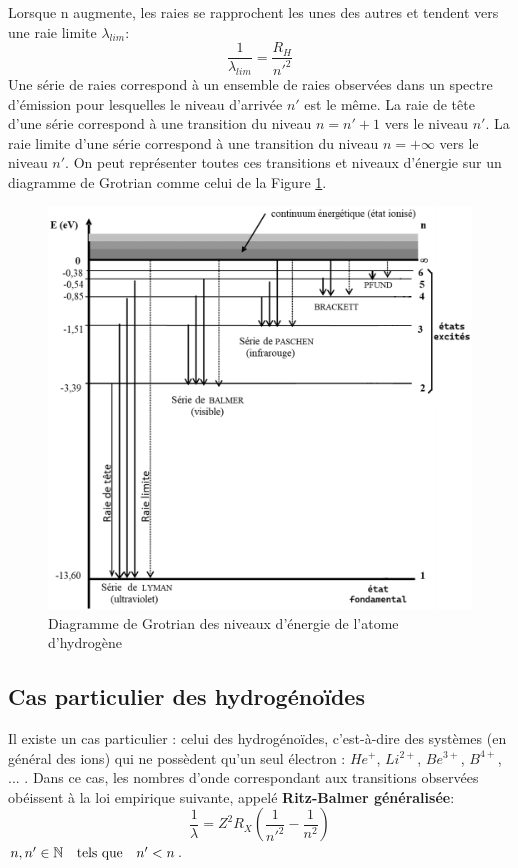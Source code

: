 \documentclass{article}
\begin{document}
\vspace{5mm} \noindent
Lorsque n augmente, les raies se rapprochent les unes des autres et tendent vers une raie limite $\lambda_{lim}$: 
$$\frac{1}{\lambda_{lim}}=\frac{R_H}{n'^2}$$
\newpage
Une série de raies correspond à un ensemble de raies observées dans un spectre d'émission pour lesquelles le niveau d'arrivée $n'$ est le même. La raie de tête d'une série correspond à une transition du niveau $n=n'+1$ vers le niveau $n'$. La raie limite d'une série correspond à une transition du niveau $n=+\infty$ vers le niveau $n'$. On peut représenter toutes ces transitions et niveaux d'énergie sur un diagramme de Grotrian comme celui de la Figure \ref{fig:Grotrian Hydrogene}.

\begin{figure}[ht]
    \centering
    \includegraphics[width=0.75\linewidth]{Fig/Grotrian-hydrogene-v2.png}
    \caption{Diagramme de Grotrian des niveaux d'énergie de l'atome d'hydrogène }
    \label{fig:Grotrian Hydrogene}
\end{figure}

\subsection{Cas particulier des hydrogénoïdes}
Il existe un cas particulier : celui des hydrogénoïdes, c'est-à-dire des systèmes (en général des ions) qui ne possèdent qu'un seul électron : $He^+$, $Li^{2+}$, $Be^{3+}$, $B^{4+}$, ... . Dans ce cas, les nombres d'onde correspondant aux transitions observées obéissent à la loi empirique suivante, appelé \textbf{Ritz-Balmer généralisée}:
\begin{equation}\label{Ritz-Balmer generalisee}
    \boxed{\frac{1}{\lambda} = Z^2R_X \left(\frac{1}{n'^2}-\frac{1}{n^2}\right)}
\end{equation}
\hfill $n,n'\in \mathbb{N} \text{\quad tels que\quad} n'<n$.
\end{document}
